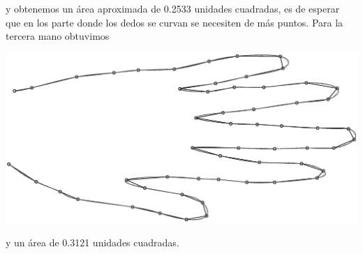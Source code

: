\begin{solution}
y obtenemos un área aproximada de 0.2533 unidades cuadradas, es de esperar que en los parte donde los dedos se curvan se necesiten de más puntos. Para la tercera mano obtuvimos

\begin{center}
    \includegraphics[scale=0.25]{Graficas/Mano2.eps}
\end{center}

y un área de 0.3121 unidades cuadradas.
\end{solution}

